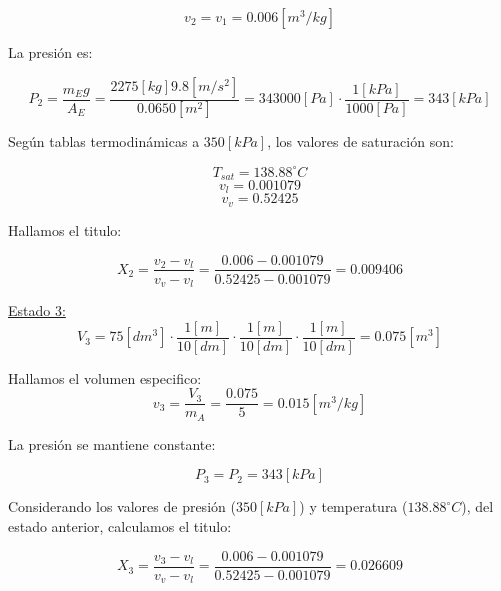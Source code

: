 \documentclass[letter,11pt]{article}
\begin{document}
\begin{enumerate}
\begin{equation*}
    v_2=v_1=0.006[m^3/kg]
\end{equation*}

La presión es:

\begin{equation*}
    P_2=\frac{m_E g}{A_E}=\frac{2275[kg]9.8[m/s^2]}{0.0650[m^2]}=343000[Pa]\cdot\frac{1[kPa]}{1000[Pa]}=343[kPa]
\end{equation*}

Según tablas termodinámicas a $350[kPa]$, los valores de saturación son:

\begin{equation*}
    T_{sat}=138.88^\circ C
\end{equation*}
\begin{equation*}
    v_l=0.001079
\end{equation*}
\begin{equation*}
    v_v=0.52425
\end{equation*}

Hallamos el titulo:

\begin{equation*}
    X_2=\frac{v_2-v_l}{v_v-v_l}=\frac{0.006-0.001079}{0.52425-0.001079}=0.009406
\end{equation*}

\underline{Estado 3:} \\

\begin{equation*}
    V_3=75[dm^3]\cdot\frac{1[m]}{10[dm]}\cdot\frac{1[m]}{10[dm]}\cdot\frac{1[m]}{10[dm]}=0.075[m^3]
\end{equation*}

Hallamos el volumen especifico:
\begin{equation*}
    v_3=\frac{V_3}{m_A}=\frac{0.075}{5}=0.015[m^3/kg]
\end{equation*}

La presión se mantiene constante:

\begin{equation*}
    P_3=P_2=343[kPa]
\end{equation*}

Considerando los valores de presión ($350[kPa]$) y temperatura ($138.88^\circ C$), del estado anterior,
calculamos el titulo:

\begin{equation*}
    X_3=\frac{v_3-v_l}{v_v-v_l}=\frac{0.006-0.001079}{0.52425-0.001079}=0.026609
\end{equation*}


\end{enumerate}
\end{document}
